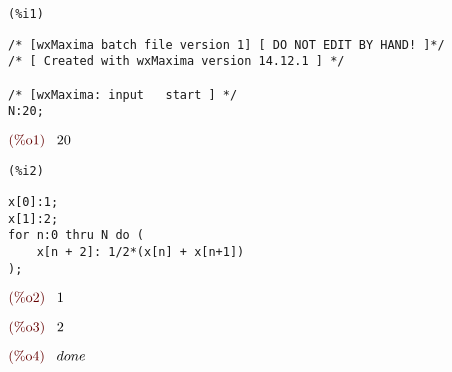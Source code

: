\documentclass{article}
\begin{document}
\noindent
\begin{minipage}[t]{8ex}{\color{red}\bf
\begin{verbatim}
(%i1) 
\end{verbatim}}
\end{minipage}
\begin{minipage}[t]{\textwidth}{\color{blue}
\begin{verbatim}
/* [wxMaxima batch file version 1] [ DO NOT EDIT BY HAND! ]*/
/* [ Created with wxMaxima version 14.12.1 ] */

/* [wxMaxima: input   start ] */
N:20;
\end{verbatim}}
\end{minipage}
\begin{math}\displaystyle
\parbox{8ex}{\color{labelcolor}(\%o1) }
20
\end{math}


\noindent
\begin{minipage}[t]{8ex}{\color{red}\bf
\begin{verbatim}
(%i2) 
\end{verbatim}}
\end{minipage}
\begin{minipage}[t]{\textwidth}{\color{blue}
\begin{verbatim}
x[0]:1;
x[1]:2;
for n:0 thru N do (
    x[n + 2]: 1/2*(x[n] + x[n+1])
);
\end{verbatim}}
\end{minipage}
\begin{math}\displaystyle
\parbox{8ex}{\color{labelcolor}(\%o2) }
1
\end{math}

\begin{math}\displaystyle
\parbox{8ex}{\color{labelcolor}(\%o3) }
2
\end{math}

\begin{math}\displaystyle
\parbox{8ex}{\color{labelcolor}(\%o4) }
done
\end{math}
\end{document}
